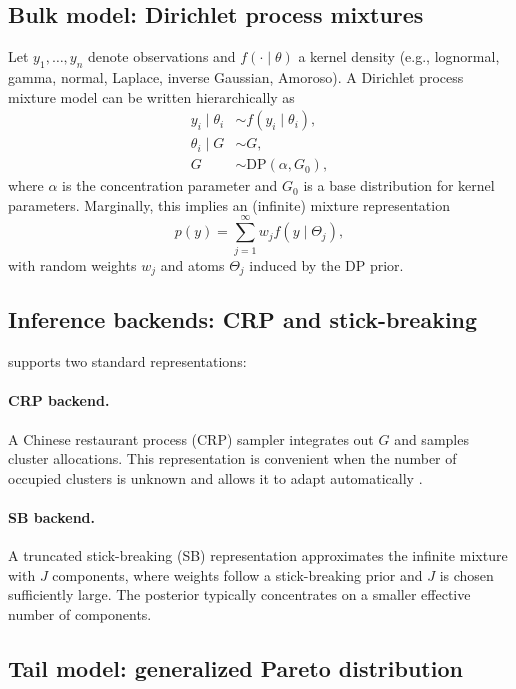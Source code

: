 \documentclass[article]{jss}\usepackage[]{graphicx}\usepackage[]{xcolor}
\begin{document}
\subsection{Bulk model: Dirichlet process mixtures}

Let $y_1,\dots,y_n$ denote observations and $f(\cdot \mid \theta)$ a kernel density (e.g., lognormal, gamma, normal, Laplace, inverse Gaussian, Amoroso).
A Dirichlet process mixture model can be written hierarchically as
\begin{align}
y_i \mid \theta_i &\sim f(y_i \mid \theta_i), \\
\theta_i \mid G &\sim G, \\
G &\sim \mathrm{DP}(\alpha, G_0),
\end{align}
where $\alpha$ is the concentration parameter and $G_0$ is a base distribution for kernel parameters.
Marginally, this implies an (infinite) mixture representation
\[
p(y) = \sum_{j=1}^{\infty} w_j f(y \mid \Theta_j),
\]
with random weights $w_j$ and atoms $\Theta_j$ induced by the DP prior.

\subsection{Inference backends: CRP and stick-breaking}

 supports two standard representations:

\paragraph{CRP backend.}
A Chinese restaurant process (CRP) sampler integrates out $G$ and samples cluster allocations.
This representation is convenient when the number of occupied clusters is unknown and allows it to adapt automatically \citep{Neal2000}.

\paragraph{SB backend.}
A truncated stick-breaking (SB) representation approximates the infinite mixture with $J$ components, where weights follow a stick-breaking prior and $J$ is chosen sufficiently large.
The posterior typically concentrates on a smaller effective number of components.

\subsection{Tail model: generalized Pareto distribution}
\end{document}
